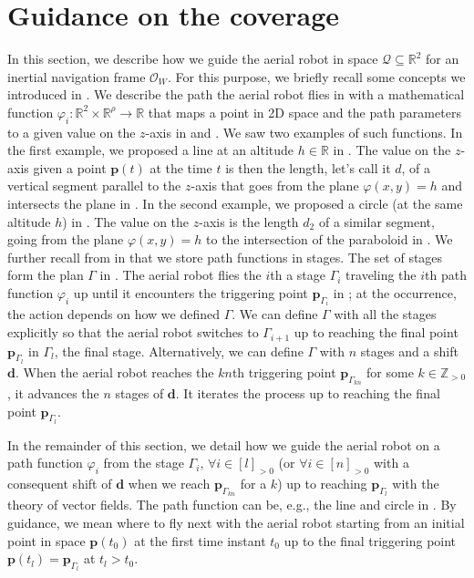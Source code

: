 \section{Guidance on the coverage}\label{sec:gvf}

In this section, we describe how we guide the aerial robot in space $\mathcal{Q}\subseteq\mathbb{R}^2$ for an inertial navigation frame $\mathcal{O}_W$. For this purpose, we briefly recall some concepts we introduced in . We describe the path the aerial robot flies in  with a mathematical function $\varphi_i:\mathbb{R}^2\times\mathbb{R}^\rho\rightarrow\mathbb{R}$ that maps a point in 2D space and the path parameters to a given value on the $z$-axis in  and . We saw two examples of such functions. In the first example, we proposed a line at an altitude $h\in\mathbb{R}$ in . The value on the $z$-axis given a point $\mathbf{p}(t)$ at the time $t$ is then the length, let's call it $d$, of a vertical segment parallel to the $z$-axis that goes from the plane $\varphi(x,y)=h$ and intersects the plane in . In the second example, we proposed a circle (at the same altitude $h$) in . The value on the $z$-axis is the length $d_2$ of a similar segment, going from the plane $\varphi(x,y)=h$ to the intersection of the paraboloid in . We further recall from  in  that we store path functions in stages. The set of stages form the plan $\Gamma$ in . The aerial robot flies the $i$th a stage $\Gamma_i$ traveling the $i$th path function $\varphi_i$ up until it encounters the triggering point $\mathbf{p}_{\Gamma_i}$ in ; at the occurrence, the action depends on how we defined $\Gamma$. We can define $\Gamma$ with all the stages explicitly so that the aerial robot switches to $\Gamma_{i+1}$ up to reaching the final point $\mathbf{p}_{\Gamma_l}$ in $\Gamma_l$, the final stage. Alternatively, we can define $\Gamma$ with $n$ stages and a shift $\mathbf{d}$. When the aerial robot reaches the $kn$th triggering point $\mathbf{p}_{\Gamma_{kn}}$ for some $k\in\mathbb{Z}_{>0}$, it advances the $n$ stages of $\mathbf{d}$. It iterates the process up to reaching the final point $\mathbf{p}_{\Gamma_l}$.

In the remainder of this section, we detail how we guide the aerial robot on a path function $\varphi_i$ from the stage $\Gamma_i,\,\forall i\in[l]_{>0}$ (or $\forall i\in[n]_{>0}$ with a consequent shift of $\mathbf{d}$ when we reach $\mathbf{p}_{\Gamma_{kn}}$ for a $k$) up to reaching $\mathbf{p}_{\Gamma_l}$ with the theory of vector fields. The path function can be, e.g., the line and circle in . By guidance, we mean where to fly next with the aerial robot starting from an initial point in space $\mathbf{p}(t_0)$ at the first time instant $t_0$ up to the final triggering point $\mathbf{p}(t_l)=\mathbf{p}_{\Gamma_l}$ at $t_l>t_0$.

